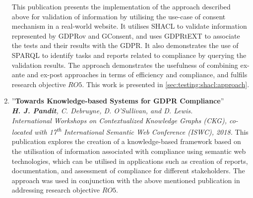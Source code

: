 \begin{enumerate}[resume]
        \vspace{0.1cm} \newline
        This publication presents the implementation of the approach described above for validation of information by utilising the use-case of consent mechanism in a real-world website. It utilises SHACL to validate information represented by GDPRov and GConsent, and uses GDPRtEXT to associate the tests and their results with the GDPR. It also demonstrates the use of SPARQL to identify tasks and reports related to compliance by querying the validation results. The approach demonstrates the usefulness of combining ex-ante and ex-post approaches in terms of efficiency and compliance, and fulfils research objective $RO5$. This work is presented in \autoref{sec:testing:shacl:approach}.
    \item ''\textbf{Towards Knowledge-based Systems for GDPR Compliance}'' \cite{pandit_towards_2018} \\
    \textit{\textbf{H. J. Pandit}, C. Debruyne, D. O’Sullivan, and D. Lewis.} \\ 
    \textit{International Workshops on Contextualized Knowledge Graphs (CKG), co-located with 17\textsuperscript{th} International Semantic Web Conference (ISWC), 2018.}
        \vspace{0.1cm} \newline This publication explores the creation of a knowledge-based framework based on the utilisation of information associated with compliance using semantic web technologies, which can be utilised in applications such as creation of reports, documentation, and assessment of compliance for different stakeholders. The approach was used in conjunction with the above mentioned publication in addressing research objective $RO5$.
\end{enumerate}

